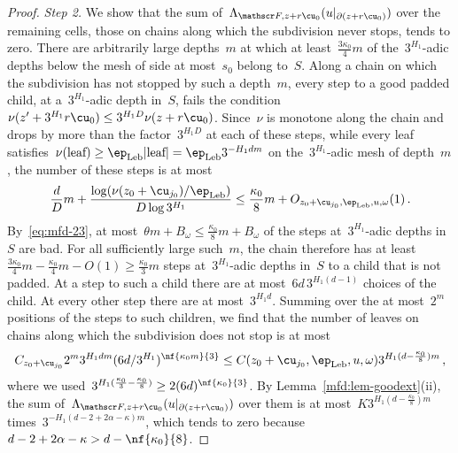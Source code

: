 \documentclass[11pt]{amsart}
\begin{document}
\begin{proof}
\emph{Step 2.} We show that the sum of~$\Lambda_{\mathscr F,z+r\cu_0}(u|_{\partial(z+r\cu_0)})$ over the remaining cells, those on chains along which the subdivision never stops, tends to zero. There are arbitrarily large depths~$m$ at which at least~$\frac{3\kappa_0}{4}m$ of the~$3^{H_1}$-adic depths below the mesh of side at most~$s_0$ belong to~$S$. Along a chain on which the subdivision has not stopped by such a depth~$m$, every step to a good padded child, at a~$3^{H_1}$-adic depth in~$S$, fails the condition~$\nu(z'+3^{H_1}r\cu_0)\leq3^{H_1D}\nu(z+r\cu_0)$. Since~$\nu$ is monotone along the chain and drops by more than the factor~$3^{H_1D}$ at each of these steps, while every leaf satisfies~$\nu(\text{leaf})\geq\ep_{\rm Leb}|\text{leaf}|=\ep_{\rm Leb}3^{-H_1dm}$ on the~$3^{H_1}$-adic mesh of depth~$m$, the number of these steps is at most
\begin{equation*}
	\frac{d}{D}m+\frac{\log(\nu(z_0+\cu_{j_0})/\ep_{\rm Leb})}{D\log3^{H_1}}
	\leq\frac{\kappa_0}{8}m+O_{z_0+\cu_{j_0},\ep_{\rm Leb},u,\omega}(1)\,.
\end{equation*}
By~\eqref{eq:mfd-23}, at most~$\theta m+B_\omega\leq\frac{\kappa_0}{8}m+B_\omega$ of the steps at~$3^{H_1}$-adic depths in~$S$ are bad. For all sufficiently large such~$m$, the chain therefore has at least~$\frac{3\kappa_0}{4}m-\frac{\kappa_0}{4}m-O(1)\geq\frac{\kappa_0}{3}m$ steps at~$3^{H_1}$-adic depths in~$S$ to a child that is not padded. At a step to such a child there are at most~$6d\,3^{H_1(d-1)}$ choices of the child. At every other step there are at most~$3^{H_1d}$. Summing over the at most~$2^m$ positions of the steps to such children, we find that the number of leaves on chains along which the subdivision does not stop is at most
\begin{equation*}
	C_{z_0+\cu_{j_0}}2^m3^{H_1dm}(6d/3^{H_1})^{\nf{\kappa_0m}{3}}\leq C(z_0+\cu_{j_0},\ep_{\rm Leb},u,\omega)3^{H_1(d-\frac{\kappa_0}{8})m}\,,
\end{equation*}
where we used~$3^{H_1(\frac{\kappa_0}{3}-\frac{\kappa_0}{8})}\geq2(6d)^{\nf{\kappa_0}{3}}$. By Lemma~\ref{mfd:lem-goodext}(ii), the sum of~$\Lambda_{\mathscr F,z+r\cu_0}(u|_{\partial(z+r\cu_0)})$ over them is at most~$K3^{H_1(d-\frac{\kappa_0}{8})m}$ times~$3^{-H_1(d-2+2\alpha-\kappa)m}$, which tends to zero because~$d-2+2\alpha-\kappa>d-\nf{\kappa_0}{8}$.

\smallskip


\end{proof}
\end{document}
